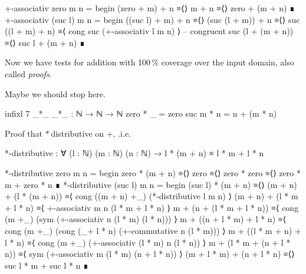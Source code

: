 \begin{code}
+-associativ zero m n =
  begin
    (zero + m) + n
  ≡⟨⟩
    m + n
  ≡⟨⟩
    zero + (m + n)
  ∎
+-associativ (suc l) m n =
  begin
    ((suc l) + m) + n
  ≡⟨⟩
    (suc (l + m)) + n
  ≡⟨⟩
    suc ((l + m) + n)
  ≡⟨ cong suc (+-associativ l m n) ⟩ -- congruent
    suc (l + (m + n))
  ≡⟨⟩
   suc l + (m + n)
  ∎
\end{code}

Now we have tests for addition with 100\,\% coverage over the input domain,
also called \emph{proofs}.

Maybe we should stop here.

\begin{code}
infixl 7 _*_
_*_ : ℕ → ℕ → ℕ
zero * _ = zero
suc m * n = n + (m * n)
\end{code}

\begin{exercise}
Proof that $*$ distributive on $+$, .i.e.

\begin{code}
*-distributive : ∀ (l : ℕ) (m : ℕ) (n : ℕ)
  → l * (m + n) ≡ l * m + l * n
\end{code}
\end{exercise}

\begin{code}
*-distributive zero m n =
  begin
    zero * (m + n)
  ≡⟨⟩
    zero
  ≡⟨⟩
    zero * zero
  ≡⟨⟩
    zero * m + zero * n
  ∎
*-distributive (suc l) m n =
  begin
    (suc l) * (m + n)
  ≡⟨⟩
    (m + n) + (l * (m + n))
  ≡⟨ cong ((m + n) +_) (*-distributive l m n) ⟩
    (m + n) + (l * m + l * n)
  ≡⟨ +-associativ m n (l * m + l * n) ⟩
    m + (n + (l * m + l * n))
  ≡⟨ cong (m +_) (sym (+-associativ n (l * m) (l * n))) ⟩
    m + ((n + l * m) + l * n)
  ≡⟨ cong (m +_) (cong (_+ l * n) (+-commutative n (l * m))) ⟩
    m + ((l * m + n) + l * n)
  ≡⟨ cong (m +_) (+-associativ (l * m) n (l * n)) ⟩
    m + (l * m + (n + l * n))
  ≡⟨ sym (+-associativ  m (l * m) (n + l * n)) ⟩
    (m + l * m) + (n + l * n)
  ≡⟨⟩
    suc l * m + suc l * n
  ∎
\end{code}
